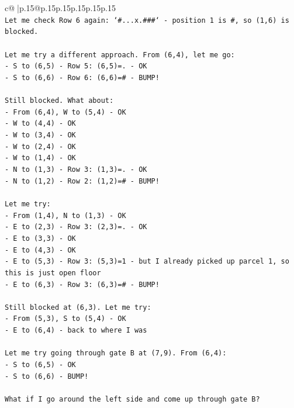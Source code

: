 \documentclass{article}
\begin{document}
{\begin{supertabular}{c@{$\;$}|p{.15\linewidth}@{}p{.15\linewidth}p{.15\linewidth}p{.15\linewidth}p{.15\linewidth}p{.15\linewidth}}
{{{\\ 
\texttt{Let me check Row 6 again: `\#...x.\#\#\#` {-} position 1 is \#, so (1,6) is blocked.} \\
\\ 
\texttt{Let me try a different approach. From (6,4), let me go:} \\
\texttt{{-} S to (6,5) {-} Row 5: (6,5)=. {-} OK} \\
\texttt{{-} S to (6,6) {-} Row 6: (6,6)=\# {-} BUMP!} \\
\\ 
\texttt{Still blocked. What about:} \\
\texttt{{-} From (6,4), W to (5,4) {-} OK} \\
\texttt{{-} W to (4,4) {-} OK} \\
\texttt{{-} W to (3,4) {-} OK} \\
\texttt{{-} W to (2,4) {-} OK} \\
\texttt{{-} W to (1,4) {-} OK} \\
\texttt{{-} N to (1,3) {-} Row 3: (1,3)=. {-} OK} \\
\texttt{{-} N to (1,2) {-} Row 2: (1,2)=\# {-} BUMP!} \\
\\ 
\texttt{Let me try:} \\
\texttt{{-} From (1,4), N to (1,3) {-} OK} \\
\texttt{{-} E to (2,3) {-} Row 3: (2,3)=. {-} OK} \\
\texttt{{-} E to (3,3) {-} OK} \\
\texttt{{-} E to (4,3) {-} OK} \\
\texttt{{-} E to (5,3) {-} Row 3: (5,3)=1 {-} but I already picked up parcel 1, so this is just open floor} \\
\texttt{{-} E to (6,3) {-} Row 3: (6,3)=\# {-} BUMP!} \\
\\ 
\texttt{Still blocked at (6,3). Let me try:} \\
\texttt{{-} From (5,3), S to (5,4) {-} OK} \\
\texttt{{-} E to (6,4) {-} back to where I was} \\
\\ 
\texttt{Let me try going through gate B at (7,9). From (6,4):} \\
\texttt{{-} S to (6,5) {-} OK} \\
\texttt{{-} S to (6,6) {-} BUMP!} \\
\\ 
\texttt{What if I go around the left side and come up through gate B?} \\
}}}
\end{supertabular}}
\end{document}
